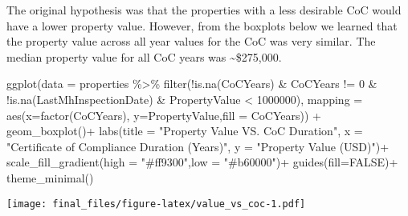 \documentclass[
]{article}
\newenvironment{Shaded}{\begin{snugshade}}{\end{snugshade}}
\newcommand{\AttributeTok}[1]{\textcolor[rgb]{0.77,0.63,0.00}{#1}}
\newcommand{\ConstantTok}[1]{\textcolor[rgb]{0.00,0.00,0.00}{#1}}
\newcommand{\DecValTok}[1]{\textcolor[rgb]{0.00,0.00,0.81}{#1}}
\newcommand{\FunctionTok}[1]{\textcolor[rgb]{0.00,0.00,0.00}{#1}}
\newcommand{\NormalTok}[1]{#1}
\newcommand{\SpecialCharTok}[1]{\textcolor[rgb]{0.00,0.00,0.00}{#1}}
\newcommand{\StringTok}[1]{\textcolor[rgb]{0.31,0.60,0.02}{#1}}
\begin{document}
The original hypothesis was that the properties with a less desirable
CoC would have a lower property value. However, from the boxplots below
we learned that the property value across all year values for the CoC
was very similar. The median property value for all CoC years was
\textasciitilde\$275,000.

\begin{Shaded}
\begin{Highlighting}[]
\FunctionTok{ggplot}\NormalTok{(}\AttributeTok{data =}\NormalTok{ properties }\SpecialCharTok{\%\textgreater{}\%} 
               \FunctionTok{filter}\NormalTok{(}\SpecialCharTok{!}\FunctionTok{is.na}\NormalTok{(CoCYears) }\SpecialCharTok{\&}\NormalTok{ CoCYears }\SpecialCharTok{!=} \DecValTok{0} \SpecialCharTok{\&} \SpecialCharTok{!}\FunctionTok{is.na}\NormalTok{(LastMhInspectionDate) }\SpecialCharTok{\&}\NormalTok{ PropertyValue }\SpecialCharTok{\textless{}} \DecValTok{1000000}\NormalTok{), }
       \AttributeTok{mapping =} \FunctionTok{aes}\NormalTok{(}\AttributeTok{x=}\FunctionTok{factor}\NormalTok{(CoCYears), }\AttributeTok{y=}\NormalTok{PropertyValue,}\AttributeTok{fill =}\NormalTok{ CoCYears)) }\SpecialCharTok{+} 
        \FunctionTok{geom\_boxplot}\NormalTok{()}\SpecialCharTok{+}
        \FunctionTok{labs}\NormalTok{(}\AttributeTok{title =} \StringTok{"Property Value VS. CoC Duration"}\NormalTok{,}
             \AttributeTok{x =} \StringTok{"Certificate of Compliance Duration (Years)"}\NormalTok{,}
             \AttributeTok{y =} \StringTok{"Property Value (USD)"}\NormalTok{)}\SpecialCharTok{+}
        \FunctionTok{scale\_fill\_gradient}\NormalTok{(}\AttributeTok{high =} \StringTok{"\#ff9300"}\NormalTok{,}\AttributeTok{low =} \StringTok{"\#b60000"}\NormalTok{)}\SpecialCharTok{+}
        \FunctionTok{guides}\NormalTok{(}\AttributeTok{fill=}\ConstantTok{FALSE}\NormalTok{)}\SpecialCharTok{+}
        \FunctionTok{theme\_minimal}\NormalTok{()}
\end{Highlighting}
\end{Shaded}

\texttt{[image: final\_files/figure-latex/value\_vs\_coc-1.pdf]}
\end{document}
